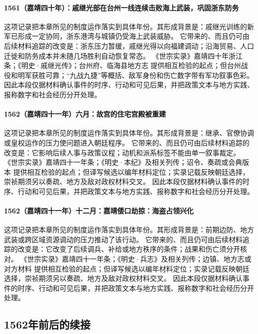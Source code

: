 \paragraph{1561（嘉靖四十年）：戚继光部在台州一线连续击败海上武装，巩固浙东防务} 这项记录把本章所见的制度运作落实到具体年份。其形成背景是：戚继光训练的新军已形成一定协同，浙东港湾与城镇仍受海上武装威胁。 它带来的、而且仍可由后续材料追踪的改变是：浙东压力暂缓，戚继光得以向福建调动；沿海贸易、人口迁徙和防务成本并未随几场胜利自动恢复常态。 《世宗实录》嘉靖四十年浙江条；《明史·戚继光传》；台州府、临海县地方志 提供相互检验的起点；但台州战役和明军获胜可靠；“九战九捷”等概括、敌军身份和伤亡数字带有军功叙事色彩。 因此本段仅据材料确认事件的时序、行动和可见后果，并把政策文本与地方实践、报称数字和社会经历分开处理。

\paragraph{1562（嘉靖四十一年）六月：故宫的住宅宫殿被重建} 这项记录把本章所见的制度运作落实到具体年份。其形成背景是：继承、官僚协调或皇权运作的压力使问题进入朝廷程序。 它带来的、而且仍可由后续材料追踪的改变是：它影响后续人事与政策议程；动机和派系标签不能由单一叙事裁定。 《世宗实录》嘉靖四十一年条；《明史·本纪》及相关列传；诏令、奏疏或会典版本 提供相互检验的起点；但译写候选以编年材料定位；实录记载反映朝廷选择，崇祯期须另以奏疏、地方及敌对政权材料交叉。 因此本段仅据材料确认事件的时序、行动和可见后果，并把政策文本与地方实践、报称数字和社会经历分开处理。

\paragraph{1562（嘉靖四十一年）十二月：嘉靖倭口劫掠：海盗占领兴化} 这项记录把本章所见的制度运作落实到具体年份。其形成背景是：前期边防、地方武装或跨区域资源调动的压力推动了该行动。 它带来的、而且仍可由后续材料追踪的改变是：它改变了后续调兵、补给或地方秩序的条件；战果和伤亡须分开核对。 《世宗实录》嘉靖四十一年条；《明史·兵志》及相关列传；边镇、地方志或对方材料 提供相互检验的起点；但译写候选以编年材料定位；实录记载反映朝廷选择，崇祯期须另以奏疏、地方及敌对政权材料交叉。 因此本段仅据材料确认事件的时序、行动和可见后果，并把政策文本与地方实践、报称数字和社会经历分开处理。

\subsection{1562年前后的续接}

